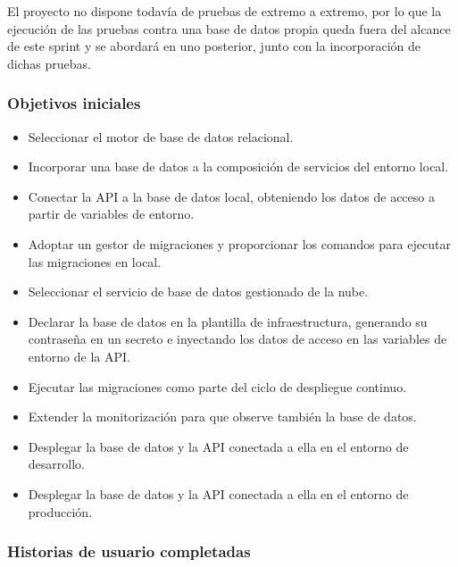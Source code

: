 El proyecto no dispone todavía de pruebas de extremo a extremo, por lo que
la ejecución de las pruebas contra una base de datos propia queda fuera del
alcance de este sprint y se abordará en uno posterior, junto con la
incorporación de dichas pruebas.

\subsubsection*{Objetivos iniciales}

\begin{itemize}
	\item Seleccionar el motor de base de datos relacional.
	\item Incorporar una base de datos a la composición de servicios del entorno
	      local.
	\item Conectar la API a la base de datos local, obteniendo los datos de acceso
	      a partir de variables de entorno.
	\item Adoptar un gestor de migraciones y proporcionar los comandos para
	      ejecutar las migraciones en local.
	\item Seleccionar el servicio de base de datos gestionado de la nube.
	\item Declarar la base de datos en la plantilla de infraestructura, generando
	      su contraseña en un secreto e inyectando los datos de acceso en las
	      variables de entorno de la API.
	\item Ejecutar las migraciones como parte del ciclo de despliegue continuo.
	\item Extender la monitorización para que observe también la base de datos.
	\item Desplegar la base de datos y la API conectada a ella en el entorno de
	      desarrollo.
	\item Desplegar la base de datos y la API conectada a ella en el entorno de
	      producción.
\end{itemize}

\subsubsection*{Historias de usuario completadas}

